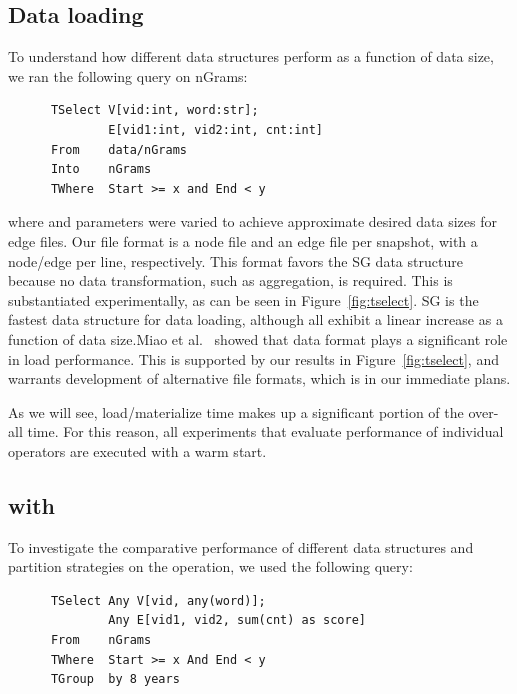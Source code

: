 \subsection{Data loading}

To understand how different data structures perform as a function of
data size, we ran the following query on nGrams:

\begin{small}
\begin{verbatim}
      TSelect V[vid:int, word:str]; 
              E[vid1:int, vid2:int, cnt:int]
      From    data/nGrams
      Into    nGrams
      TWhere  Start >= x and End < y
\end{verbatim}
\end{small}

\noindent where  and  parameters were varied to
achieve approximate desired data sizes for edge files.  Our file
format is a node file and an edge file per snapshot, with a node/edge
per line, respectively.  This format favors the SG data structure
because no data transformation, such as aggregation, is required.
This is substantiated experimentally, as can be seen in
Figure~\ref{fig:tselect}.  SG is the fastest data structure for data
loading, although all exhibit a linear increase as a function of data
size.Miao et al.~\cite{DBLP:journals/tos/MiaoHLWYZPCC15} showed that
data format plays a significant role in load performance.  This is
supported by our results in Figure~\ref{fig:tselect}, and warrants
development of alternative file formats, which is in our immediate
plans.

As we will see, load/materialize time makes up a significant portion
of the over-all time.  For this reason, all experiments that evaluate
performance of individual \ql operators are executed with a warm
start.

\subsection{ with }
\label{sec:exp:tgroup}

To investigate the comparative performance of different data
structures and partition strategies on the  operation, we used
the following query:

\begin{small}
\begin{verbatim}
      TSelect Any V[vid, any(word)];
              Any E[vid1, vid2, sum(cnt) as score]
      From    nGrams
      TWhere  Start >= x And End < y
      TGroup  by 8 years
\end{verbatim}
\end{small}

